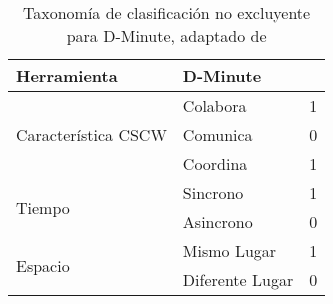 \begin{table}[t]
\centering
\caption{ Taxonomía de clasificación no excluyente para D-Minute, adaptado de }\newline\newline
\label{tab:taxonomia}
\begin{tabular}{@{}lll@{}}
\toprule
Herramienta & \multicolumn{2}{l}{D-Minute} \\ \midrule
\multicolumn{1}{|c|}{\multirow{3}{*}{Característica CSCW}} & \multicolumn{1}{l|}{Colabora} & \multicolumn{1}{l|}{1} \\ \cmidrule(l){2-3} 
\multicolumn{1}{|c|}{} & \multicolumn{1}{l|}{Comunica} & \multicolumn{1}{l|}{0} \\ \cmidrule(l){2-3} 
\multicolumn{1}{|c|}{} & \multicolumn{1}{l|}{Coordina} & \multicolumn{1}{l|}{1} \\ \midrule
\multicolumn{1}{|l|}{\multirow{2}{*}{Tiempo}} & \multicolumn{1}{l|}{Sincrono} & \multicolumn{1}{l|}{1} \\ \cmidrule(l){2-3} 
\multicolumn{1}{|l|}{} & \multicolumn{1}{l|}{Asincrono} & \multicolumn{1}{l|}{0} \\ \midrule
\multicolumn{1}{|l|}{\multirow{2}{*}{Espacio}} & \multicolumn{1}{l|}{Mismo Lugar} & \multicolumn{1}{l|}{1} \\ \cmidrule(l){2-3} 
\multicolumn{1}{|l|}{} & Diferente Lugar & 0 \\ \bottomrule
\end{tabular}
\end{table}


